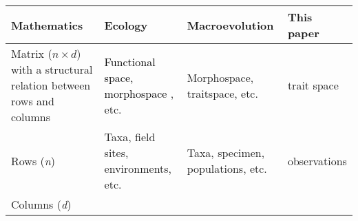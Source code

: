 \documentclass[]{article}
\begin{document}
\begin{longtable}[]{@{}llll@{}}
\toprule
\begin{minipage}[b]{0.24\columnwidth}\raggedright\strut
Mathematics\strut
\end{minipage} & \begin{minipage}[b]{0.24\columnwidth}\raggedright\strut
Ecology\strut
\end{minipage} & \begin{minipage}[b]{0.24\columnwidth}\raggedright\strut
Macroevolution\strut
\end{minipage} & \begin{minipage}[b]{0.15\columnwidth}\raggedright\strut
This paper\strut
\end{minipage}\tabularnewline
\midrule
\endhead
\begin{minipage}[t]{0.24\columnwidth}\raggedright\strut
Matrix (\(n \times d\)) with a structural relation between rows and
columns\strut
\end{minipage} & \begin{minipage}[t]{0.24\columnwidth}\raggedright\strut
\textcolor{black}{ Functional space, morphospace },
etc.\strut
\end{minipage} & \begin{minipage}[t]{0.24\columnwidth}\raggedright\strut
Morphospace, traitspace, etc.\strut
\end{minipage} & \begin{minipage}[t]{0.15\columnwidth}\raggedright\strut
trait space\strut
\end{minipage}\tabularnewline
\begin{minipage}[t]{0.24\columnwidth}\raggedright\strut
Rows (\emph{n})\strut
\end{minipage} & \begin{minipage}[t]{0.24\columnwidth}\raggedright\strut
Taxa, field sites, environments, etc.\strut
\end{minipage} & \begin{minipage}[t]{0.24\columnwidth}\raggedright\strut
Taxa, specimen, populations, etc.\strut
\end{minipage} & \begin{minipage}[t]{0.15\columnwidth}\raggedright\strut
observations\strut
\end{minipage}\tabularnewline
\begin{minipage}[t]{0.24\columnwidth}\raggedright\strut
Columns (\emph{d})\strut
\end{minipage} & \begin{minipage}[t]{0.24\columnwidth}\raggedright\strut

\end{minipage}
\end{longtable}
\end{document}
